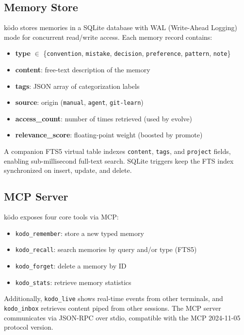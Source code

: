 \documentclass{article}
\begin{document}
\subsection{Memory Store}
\label{sec:store}

k\=odo stores memories in a SQLite database with WAL (Write-Ahead Logging) mode for concurrent read/write access. Each memory record contains:

\begin{itemize}
    \item \textbf{type} $\in$ \{\texttt{convention}, \texttt{mistake}, \texttt{decision}, \texttt{preference}, \texttt{pattern}, \texttt{note}\}
    \item \textbf{content}: free-text description of the memory
    \item \textbf{tags}: JSON array of categorization labels
    \item \textbf{source}: origin (\texttt{manual}, \texttt{agent}, \texttt{git-learn})
    \item \textbf{access\_count}: number of times retrieved (used by evolve)
    \item \textbf{relevance\_score}: floating-point weight (boosted by promote)
\end{itemize}

A companion FTS5 virtual table indexes \texttt{content}, \texttt{tags}, and \texttt{project} fields, enabling sub-millisecond full-text search. SQLite triggers keep the FTS index synchronized on insert, update, and delete.

\subsection{MCP Server}
\label{sec:mcp}

k\=odo exposes four core tools via MCP:
\begin{itemize}
    \item \texttt{kodo\_remember}: store a new typed memory
    \item \texttt{kodo\_recall}: search memories by query and/or type (FTS5)
    \item \texttt{kodo\_forget}: delete a memory by ID
    \item \texttt{kodo\_stats}: retrieve memory statistics
\end{itemize}
Additionally, \texttt{kodo\_live} shows real-time events from other terminals, and \texttt{kodo\_inbox} retrieves content piped from other sessions. The MCP server communicates via JSON-RPC over stdio, compatible with the MCP 2024-11-05 protocol version.
\end{document}
